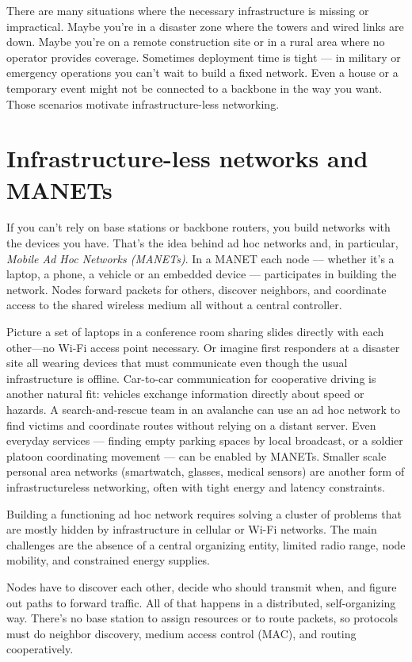 There are many situations where the necessary infrastructure is missing or impractical. Maybe you’re in a disaster zone where the towers and wired links are down. Maybe you’re on a remote construction site or in a rural area where no operator provides coverage. Sometimes deployment time is tight — in military or emergency operations you can’t wait to build a fixed network. Even a house or a temporary event might not be connected to a backbone in the way you want.
Those scenarios motivate infrastructure-less networking.

\section{Infrastructure-less networks and MANETs}
If you can’t rely on base stations or backbone routers, you build networks with the devices you have. That’s the idea behind ad hoc networks and, in particular, \textit{Mobile Ad Hoc Networks (MANETs)}. In a MANET each node — whether it’s a laptop, a phone, a vehicle or an embedded device — participates in building the network. Nodes forward packets for others, discover neighbors, and coordinate access to the shared wireless medium all without a central controller.

Picture a set of laptops in a conference room sharing slides directly with each other—no Wi-Fi access point necessary. Or imagine first responders at a disaster site all wearing devices that must communicate even though the usual infrastructure is offline. Car-to-car communication for cooperative driving is another natural fit: vehicles exchange information directly about speed or hazards. A search-and-rescue team in an avalanche can use an ad hoc network to find victims and coordinate routes without relying on a distant server. Even everyday services — finding empty parking spaces by local broadcast, or a soldier platoon coordinating movement — can be enabled by MANETs. Smaller scale personal area networks (smartwatch, glasses, medical sensors) are another form of infrastructureless networking, often with tight energy and latency constraints.

Building a functioning ad hoc network requires solving a cluster of problems that are mostly hidden by infrastructure in cellular or Wi-Fi networks. The main challenges are the absence of a central organizing entity, limited radio range, node mobility, and constrained energy supplies.

Nodes have to discover each other, decide who should transmit when, and figure out paths to forward traffic. All of that happens in a distributed, self-organizing way. There’s no base station to assign resources or to route packets, so protocols must do neighbor discovery, medium access control (MAC), and routing cooperatively.

